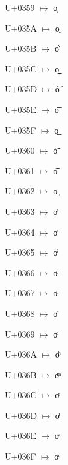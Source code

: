 {\noindent U+0359  $\mapsto$ {\cdmformat o͙}\par
\noindent U+035A  $\mapsto$ {\cdmformat o͚}\par
\noindent U+035B  $\mapsto$ {\cdmformat o͛}\par
\noindent U+035C  $\mapsto$ {\cdmformat o͜}\par
\noindent U+035D  $\mapsto$ {\cdmformat o͝}\par
\noindent U+035E  $\mapsto$ {\cdmformat o͞}\par
\noindent U+035F  $\mapsto$ {\cdmformat o͟}\par
\noindent U+0360  $\mapsto$ {\cdmformat o͠}\par
\noindent U+0361  $\mapsto$ {\cdmformat o͡}\par
\noindent U+0362  $\mapsto$ {\cdmformat o͢}\par
\noindent U+0363  $\mapsto$ {\cdmformat oͣ}\par
\noindent U+0364  $\mapsto$ {\cdmformat oͤ}\par
\noindent U+0365  $\mapsto$ {\cdmformat oͥ}\par
\noindent U+0366  $\mapsto$ {\cdmformat oͦ}\par
\noindent U+0367  $\mapsto$ {\cdmformat oͧ}\par
\noindent U+0368  $\mapsto$ {\cdmformat oͨ}\par
\noindent U+0369  $\mapsto$ {\cdmformat oͩ}\par
\noindent U+036A  $\mapsto$ {\cdmformat oͪ}\par
\noindent U+036B  $\mapsto$ {\cdmformat oͫ}\par
\noindent U+036C  $\mapsto$ {\cdmformat oͬ}\par
\noindent U+036D  $\mapsto$ {\cdmformat oͭ}\par
\noindent U+036E  $\mapsto$ {\cdmformat oͮ}\par
\noindent U+036F  $\mapsto$ {\cdmformat oͯ}\par
}
